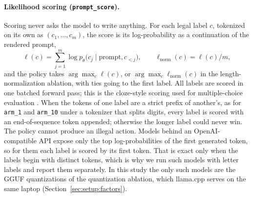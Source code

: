 \paragraph{Likelihood scoring (\texttt{prompt\_score}).}
Scoring never asks the model to write anything. For each legal label $c$, tokenized on its own as $(c_1,\dots,c_m)$, the score is its log-probability as a continuation of the rendered prompt,
\begin{equation}
\label{eq:score}
\ell(c) = \sum_{j=1}^{m} \log p_\theta\bigl(c_j \mid \text{prompt}, c_{<j}\bigr),
\qquad
\ell_{\mathrm{norm}}(c) = \ell(c)/m,
\end{equation}
and the policy takes $\arg\max_c \ell(c)$, or $\arg\max_c \ell_{\mathrm{norm}}(c)$ in the length-normalization ablation, with ties going to the first label. All labels are scored in one batched forward pass; this is the cloze-style scoring used for multiple-choice evaluation \citep{holtzman2021surface,robinson2023mcsb}. When the tokens of one label are a strict prefix of another's, as for \texttt{arm\_1} and \texttt{arm\_10} under a tokenizer that splits digits, every label is scored with an end-of-sequence token appended; otherwise the longer label could never win. The policy cannot produce an illegal action. Models behind an OpenAI-compatible API expose only the top log-probabilities of the first generated token, so for them each label is scored by its first token. That is exact only when the labels begin with distinct tokens, which is why we run such models with letter labels and report them separately. In this study the only such models are the GGUF quantizations of the quantization ablation, which llama.cpp serves on the same laptop (Section~\ref{sec:setup:factors}).

